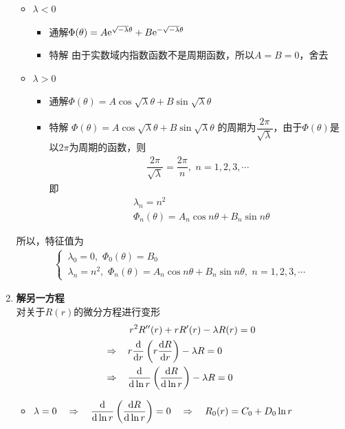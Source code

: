 \begin{enumerate}[\textbf{步骤}1 ]
\begin{itemize}
		\item $\lambda < 0$
		\begin{itemize}
			\item 通解\quad $\Phi(\theta) = A{\rm{e}}^{\sqrt{-\lambda}\theta} + B {\rm{e}}^{-\sqrt{-\lambda}\theta}$
			\item 特解 \quad 由于实数域内指数函数不是周期函数，所以$A = B = 0$，舍去
		\end{itemize}
		
		\item $\lambda > 0$
		\begin{itemize}
			\item 通解\quad $\Phi(\theta) = A \cos \sqrt{\lambda}\theta  + B\sin \sqrt{\lambda}\theta $
			\item 特解 \quad $\Phi(\theta) = A \cos \sqrt{\lambda}\theta  + B\sin  \sqrt{\lambda}\theta $ 的周期为$\dfrac{2 \pi}{\sqrt{\lambda}}$，由于$\Phi(\theta)$是以$2 \pi $为周期的函数，则
			\begin{align*}
				\dfrac{2 \pi}{\sqrt{\lambda}} = \dfrac{2\pi}{n}, \,\, n = 1,2,3,\cdots
			\end{align*}
			即
			\begin{align}
				&\lambda_n = n^2\\
				&\Phi_n(\theta) = A_n \cos n\theta  + B_n \sin n\theta 
			\end{align}
		\end{itemize}
	\end{itemize}
	所以，特征值为
	\begin{align*}
		\begin{cases}
			\, \lambda_0 = 0,\,\, \Phi_0(\theta) = B_0\\
			\, \lambda_n = n^2,\, \, \Phi_n(\theta) = A_n \cos n\theta  + B_n \sin n \theta ,\,\, n = 1,2,3,\cdots
		\end{cases}
	\end{align*}

	\item \textbf{解另一方程}\\
	对关于$R(r)$的微分方程进行变形
	\begin{align*}
		&\,\,\quad r^2 R''(r) + rR'(r) - \lambda R(r) = 0\\
		\Rightarrow & \,\quad r \dfrac{{\rm{d}} }{{\rm{d}} r}\left(r \dfrac{{\rm{d}} R}{{\rm{d}} r}\right) - \lambda R = 0\\
		\Rightarrow & \,\quad \dfrac{{\rm{d}} }{{\rm{d}} \ln r} \left(\dfrac{{\rm{d}} R}{{\rm{d}} \ln r}\right) - \lambda R = 0
	\end{align*}
	\begin{itemize}
		\item $\lambda = 0 \quad \Rightarrow \quad \dfrac{{\rm{d}} }{{\rm{d}} \ln r} \left(\dfrac{{\rm{d}} R}{{\rm{d}} \ln r}\right) = 0 \quad \Rightarrow \quad R_0(r) = C_0 + D_0 \ln r$\vspace*{1em}
		

\end{itemize}
\end{enumerate}

